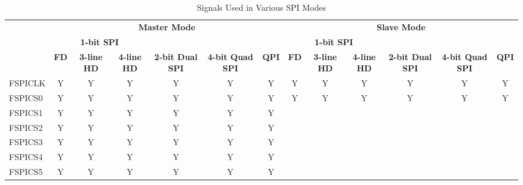 \documentclass[main\_\_EN.tex]{subfiles}
\begin{document}
\begin{landscape}
\begin{table}[H]
    \centering
    \caption{Signals Used in Various SPI Modes}
    \label{tab:singals-used-in-various-spi-modes}

    \begin{threeparttable}
    \begin{tabular}{ |p{2.0cm} |c|c|c|c|c|c|c|c|c|c|c|c| }
    \hline
        \rowcolor{lightgray}
        & \multicolumn{6}{c|}{\textbf{Master Mode}} & \multicolumn{6}{c|}{\textbf{Slave Mode}} \\\cline{2-13}
        \rowcolor{lightgray}
        & \multicolumn{3}{c|}{\textbf{1-bit SPI}} & & & & \multicolumn{3}{c|}{\textbf{1-bit SPI}} & & & \\ \cline{2-4} \cline{8-10}
        \rowcolor{lightgray}
        \multirow{-3}{*}{\textbf{FSPI Signal}} & \textbf{FD\tnote{1}} & \textbf{3-line HD\tnote{2}} & \textbf{4-line HD} & \multirow{-2}{*}{\textbf{2-bit Dual SPI}} & \multirow{-2}{*}{\textbf{4-bit Quad SPI}} & \multirow{-2}{*}{\textbf{QPI}} & \textbf{FD} & \textbf{3-line HD} & \textbf{4-line HD} & \multirow{-2}{*}{\textbf{2-bit Dual SPI}} & \multirow{-2}{*}{\textbf{4-bit Quad SPI}} & \multirow{-2}{*}{\textbf{QPI}} \\ \hline
FSPICLK                  & Y       & Y       & Y       & Y       & Y       & Y      & Y       & Y      & Y       & Y       & Y       & Y      \\ \hline
FSPICS0                  & Y       & Y       & Y       & Y       & Y       & Y      & Y       & Y      & Y       & Y       & Y       & Y      \\ \hline
FSPICS1                  & Y       & Y       & Y       & Y       & Y       & Y      &         &        &         &         &         &        \\ \hline
FSPICS2                  & Y       & Y       & Y       & Y       & Y       & Y      &         &        &         &         &         &        \\ \hline
FSPICS3                  & Y       & Y       & Y       & Y       & Y       & Y      &         &        &         &         &         &        \\ \hline
FSPICS4                  & Y       & Y       & Y       & Y       & Y       & Y      &         &        &         &         &         &        \\ \hline
FSPICS5                  & Y       & Y       & Y       & Y       & Y       & Y      &         &        &         &         &         &        \\ \hline

\end{tabular}
\end{threeparttable}
\end{table}
\end{landscape}
\end{document}
